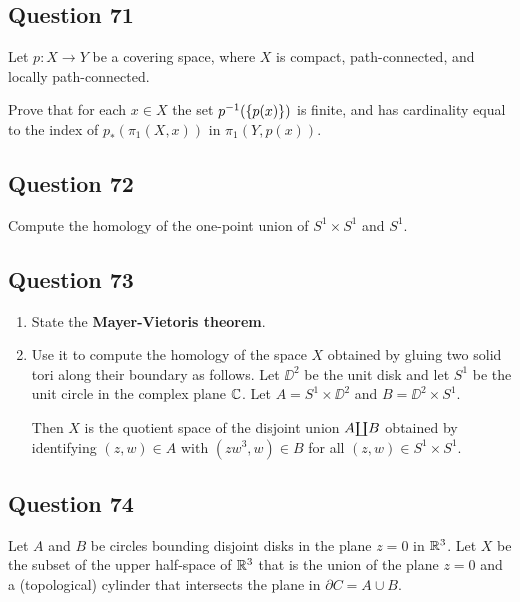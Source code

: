 \documentclass[12pt]{article}
\begin{document}
\hypertarget{question-71-3}{%
\subsection{Question 71}\label{question-71-3}}

Let \(p : X \to Y\) be a covering space, where \(X\) is compact,
path-connected, and locally path-connected.

Prove that for each \(x \in X\) the set \(p^{-1} (\left\{{p(x)}\right\})\) is
finite, and has cardinality equal to the index of \(p_* (\pi_1 (X, x))\)
in \(\pi_1 (Y, p(x))\).

\hypertarget{question-72-3}{%
\subsection{Question 72}\label{question-72-3}}

Compute the homology of the one-point union of \(S^1 \times S^1\) and
\(S^1\).

\hypertarget{question-73-3}{%
\subsection{Question 73}\label{question-73-3}}

\begin{enumerate}
\def\labelenumi{\alph{enumi}.}
\item
  State the \textbf{Mayer-Vietoris theorem}.
\item
  Use it to compute the homology of the space \(X\) obtained by gluing
  two solid tori along their boundary as follows. Let \(\DD^2\) be the
  unit disk and let \(S^1\) be the unit circle in the complex plane
  \({\mathbb{C}}\). Let \(A = S^1 \times \DD^2\) and \(B = \DD^2 \times S^1\).

  Then \(X\) is the quotient space of the disjoint union
  \(A {\coprod} B\) obtained by identifying \((z, w) \in A\) with
  \((zw^3 , w) \in B\) for all \((z, w) \in S^1 \times S^1\).
\end{enumerate}

\hypertarget{question-74-3}{%
\subsection{Question 74}\label{question-74-3}}

Let \(A\) and \(B\) be circles bounding disjoint disks in the plane
\(z = 0\) in \({\mathbb{R}}^3\). Let \(X\) be the subset of the upper half-space
of \({\mathbb{R}}^3\) that is the union of the plane \(z = 0\) and a
(topological) cylinder that intersects the plane in
\(\partial C = A \cup B\).
\end{document}
